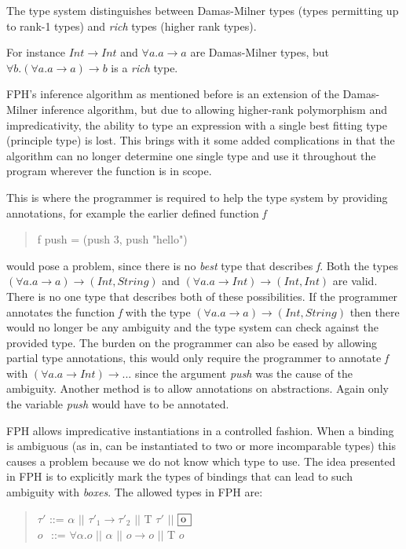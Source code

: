 The type system distinguishes between Damas-Milner types (types permitting up to rank-1 types) and \textit{rich} types (higher rank types).

For instance $Int \rightarrow Int$ and $\forall a. a \rightarrow a$ are Damas-Milner types, but $\forall b.(\forall a. a \rightarrow a) \rightarrow b$ is a \textit{rich} type.

FPH's inference algorithm as mentioned before is an extension of the Damas-Milner inference algorithm, but due to allowing higher-rank polymorphism and impredicativity, the ability to type an expression with a single best fitting type (principle type) is lost. This brings with it some added complications in that the algorithm can no longer determine one single type and use it throughout the program wherever the function is in scope.

This is where the programmer is required to help the type system by providing annotations, for example the earlier defined function \emph{f}
\begin{quotation}
f push = (push 3, push "hello")
\end{quotation}
would pose a problem, since there is no \emph{best} type that describes \emph{f}. Both the types $(\forall a. a \rightarrow a) \rightarrow (Int, String)$ and $(\forall a. a \rightarrow Int) \rightarrow (Int, Int)$ are valid. There is no one type that describes both of these possibilities.
If the programmer annotates the function \emph{f} with the type $(\forall a. a \rightarrow a) \rightarrow (Int, String)$ then there would no longer be any ambiguity and the type system can check against the provided type.
The burden on the programmer can also be eased by allowing partial type annotations, this would only require the programmer to annotate \emph{f} with $(\forall a. a \rightarrow Int) \rightarrow ...$ since the argument \emph{push} was the cause of the ambiguity. Another method is to allow annotations on abstractions. Again only the variable \emph{push} would have to be annotated.

FPH allows impredicative instantiations in a controlled fashion. When a binding is ambiguous (as in, can be instantiated to two or more incomparable types) this causes a problem because we do not know which type to use. The idea presented in FPH is to explicitly mark the types of bindings that can lead to such ambiguity with \textit{boxes}. The allowed types in FPH are:

\begin{quotation}
$\tau'$ ::= $\alpha$ $||$  $\tau'_1 \rightarrow \tau'_2$ $||$ T $\tau'$ $||$ $\framebox[0.45cm][l]{o}$ \\
\indent $o$ $\hspace{1pt}$ ::= $\forall \alpha.o$ $||$ $\alpha$ $||$ $o \rightarrow o$ $||$ T $o$
\end{quotation}


